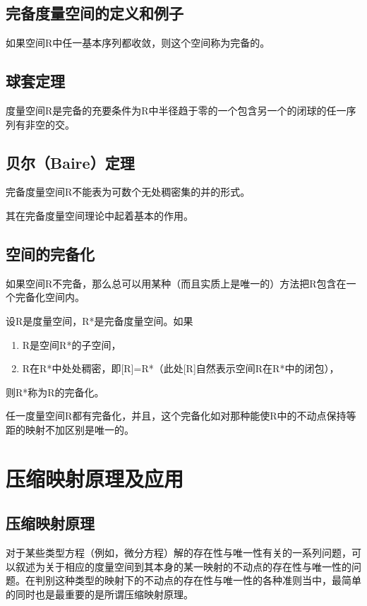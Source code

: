 \subsection{完备度量空间的定义和例子}
\begin{definition}
	\label{def2.1}
	如果空间R中任一基本序列都收敛，则这个空间称为完备的。
\end{definition}

\subsection{球套定理}
\begin{theorem}
	\label{th2.3.1}
	度量空间R是完备的充要条件为R中半径趋于零的一个包含另一个的闭球的任一序列有非空的交。
\end{theorem}

\subsection{贝尔（Baire）定理}
\begin{theorem}
	\label{th2.3.2}
	完备度量空间R不能表为可数个无处稠密集的并的形式。
\end{theorem}
其在完备度量空间理论中起着\textcolor[rgb]{1,0,0}{基本的作用}。

\subsection{空间的完备化}
如果空间R不完备，那么总可以用某种（而且实质上是唯一的）方法把R包含在一个完备化空间内。
\begin{definition}
	\label{def2.2}
	设R是度量空间，R*是完备度量空间。如果
	\begin{enumerate}[1)]
		\item R是空间R*的子空间，
		\item R在R*中处处稠密，即[R]=R*（此处[R]自然表示空间R在R*中的闭包），
	\end{enumerate}
	则R*称为R的完备化。
\end{definition}
\begin{theorem}
	\label{th2.3.3}
	任一度量空间R都有完备化，并且，这个完备化如对那种能使R中的不动点保持等距的映射不加区别是唯一的。
\end{theorem}

\section{压缩映射原理及应用}
\subsection{压缩映射原理}
对于某些类型方程（例如，微分方程）解的存在性与唯一性有关的一系列问题，可以叙述为关于相应的度量空间到其本身的某一映射的不动点的存在性与唯一性的问题。在判别这种类型的映射下的不动点的存在性与唯一性的各种准则当中，最简单的同时也是最重要的是所谓压缩映射原理。


